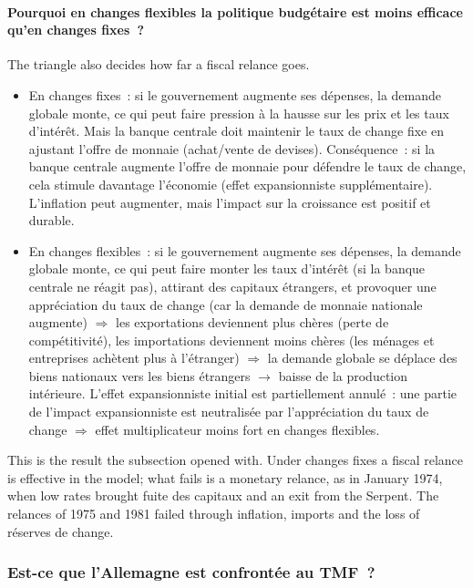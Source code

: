 \paragraph{Pourquoi en changes flexibles la politique budgétaire est moins efficace qu'en changes fixes~?}
The triangle also decides how far a fiscal relance goes.
\begin{itemize}
  \item En changes fixes~: si le gouvernement augmente ses dépenses, la demande globale
    monte, ce qui peut faire pression à la hausse sur les prix et les taux d'intérêt.
    Mais la banque centrale doit maintenir le taux de change fixe en ajustant l'offre de
    monnaie (achat/vente de devises). Conséquence~: si la banque centrale augmente
    l'offre de monnaie pour défendre le taux de change, cela stimule davantage
    l'économie (effet expansionniste supplémentaire). L'inflation peut augmenter, mais
    l'impact sur la croissance est positif et durable.
  \item En changes flexibles~: si le gouvernement augmente ses dépenses, la demande
    globale monte, ce qui peut faire monter les taux d'intérêt (si la banque centrale
    ne réagit pas), attirant des capitaux étrangers, et provoquer une appréciation du
    taux de change (car la demande de monnaie nationale augmente) $\Rightarrow$ les
    exportations deviennent plus chères (perte de compétitivité), les importations
    deviennent moins chères (les ménages et entreprises achètent plus à l'étranger)
    $\Rightarrow$ la demande globale se déplace des biens nationaux vers les biens
    étrangers $\to$ baisse de la production intérieure. L'effet expansionniste initial
    est partiellement annulé~: une partie de l'impact expansionniste est neutralisée
    par l'appréciation du taux de change $\Rightarrow$ effet multiplicateur moins fort
    en changes flexibles.
\end{itemize}
This is the result the subsection opened with. Under changes fixes a fiscal relance is
effective in the model; what fails is a monetary relance, as in January 1974, when low
rates brought fuite des capitaux and an exit from the Serpent. The relances of 1975 and
1981 failed through inflation, imports and the loss of réserves de change.

\subsubsection{Est-ce que l'Allemagne est confrontée au TMF~?}


